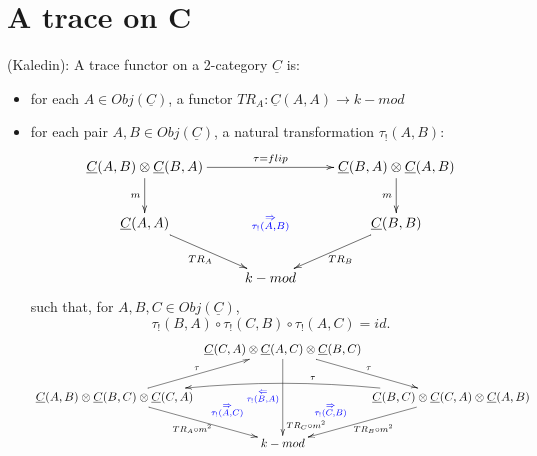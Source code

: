 \section{A trace on C} \label{sec:2cat_trace_eg}
%
\begin{defn} \label{def:trace_functor}
(Kaledin): A trace functor on a 
2-category $\underline{C}$ is:
\begin{itemize}
	\item for each $A \in Obj(\underline{C})$, a functor 
	$TR_A: \underline{C}(A,A) \to k-mod$
	\item for each pair $A, B \in Obj(\underline{C})$, a natural transformation
	$\tau_!(A,B)$:
	$$\xymatrix{
	\underline{C}(A,B) \otimes \underline{C}(B,A)
	\ar[rr]^{\tau = flip}
	\ar[d]_{m}
	&& \underline{C}(B,A) \otimes \underline{C}(A,B)
	\ar[d]_{m} \\
	\underline{C}(A,A)
	\ar[rd]_{TR_A}
	& \textcolor{blue}{\substack{\Rightarrow\\ \tau_!(A,B)}}
	& \underline{C}(B,B) 
	\ar[ld]^{TR_B}\\
	& k-mod
	}$$
	such that, for $A,B,C \in Obj(\underline{C})$, 
	\begin{equation*} 
	\tau_!(B,A) \circ \tau_!(C,B) \circ \tau_!(A,C) = id.
	\end{equation*}
	$$\xymatrixcolsep{0.25pc}
	\xymatrix{
	& \underline{C}(C,A) \otimes \underline{C}(A,C) \otimes \underline{C}(B,C) 
	\ar[rd]^{\tau}
	\ar[dd]_{\textcolor{blue}{
		\substack{\Leftarrow\\ \tau_!(B,A)}}}^{\substack{
		\\\\\\\\\\\\\\\\\\TR_C \circ m^2}}\\
	\underline{C}(A,B) \otimes \underline{C}(B,C) \otimes \underline{C}(C,A) 
	\ar[ru]^{\tau}
	\ar[rd]^{\textcolor{blue}{\quad \quad \quad \substack{\Rightarrow\\ \tau_!(A,C)}}}_{TR_A\circ m^2}
	&& \underline{C}(B,C) \otimes \underline{C}(C,A) \otimes \underline{C}(A,B)
	\ar@/_1pc/[ll]_{\quad \quad \quad \quad \quad \tau}
	\ar[ld]_{\textcolor{blue}{\substack{\Rightarrow\\ \tau_!(C,B)}}\quad \quad\quad \quad}^{TR_B \circ m^2}\\
	& k-mod
	}$$
\end{itemize}
\end{defn}
